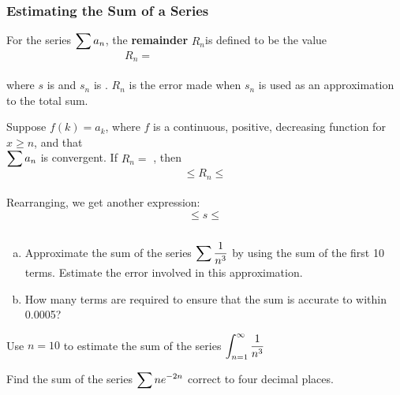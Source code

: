 \documentclass[notes]{subfiles}
\begin{document}
	\subsubsection*{Estimating the Sum of a Series}	
		\begin{defn}
			For the series $\displaystyle \sum a_n$, the \textbf{remainder} $R_n$is defined to be the value\\
				\[R_n =\hspace{2in}\]
				\\
			where $s$ is  and $s_n$ is .  $R_n$ is the error made when $s_n$ is used as an approximation to the total sum.
		\end{defn}
		
		\begin{rmk}
			Suppose $f(k) = a_k$, where $f$ is a continuous, positive, decreasing function for $x\geq n$, and that\\[15pt] $\displaystyle \sum a_n$ is convergent.  If $R_n =$ , then\\
				\[\leq R_n \leq\]
				\\
			Rearranging, we get another expression:\\
				\[\leq s \leq\]
		\end{rmk}
		
		\begin{ex}
			$ $
			\begin{enumerate}[(a)]
				\item Approximate the sum of the series $\displaystyle \sum \dfrac{1}{n^3}$ by using the sum of the first 10 terms.  Estimate the error involved in this approximation.
					\newpage
					
				\item How many terms are required to ensure that the sum is accurate to within 0.0005?
					
			\end{enumerate}
		\end{ex}
		
		\begin{ex}
			Use $n = 10$ to estimate the sum of the series $\displaystyle \int_{n =1 }^\infty \dfrac{1}{n^3}$
		\end{ex}
			\vs{1}
			
		\begin{ex}
			Find the sum of the series $\displaystyle \sum ne^{-2n}$ correct to four decimal places.
		\end{ex}
			\newpage
			
\end{document}

